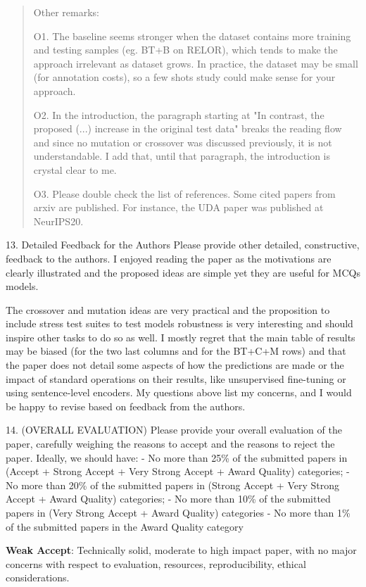 \documentclass{article}
\begin{document}
\begin{quote}
Other remarks:

O1. The baseline seems stronger when the dataset contains more training and testing samples (eg. BT+B on RELOR), which tends to make the approach irrelevant as dataset grows. In practice, the dataset may be small (for annotation costs), so a few shots study could make sense for your approach. 

O2. In the introduction, the paragraph starting at "In contrast, the proposed (...) increase in the original test data" breaks the reading flow and since no mutation or crossover was discussed previously, it is not understandable. I add that, until that paragraph, the introduction is crystal clear to me. 

O3. Please double check the list of references. 
Some cited papers from arxiv are published. For instance, the UDA paper was published at NeurIPS20. 
\end{quote}

13. {Detailed Feedback for the Authors} Please provide other detailed, constructive, feedback to the authors.
I enjoyed reading the paper as the motivations are clearly illustrated and the proposed ideas are simple yet they are useful for MCQs models. 

The crossover and mutation ideas are very practical and the proposition to include stress test suites to test models robustness is very interesting and should inspire other tasks to do so as well. 
I mostly regret that the main table of results may be biased (for the two last columns and for the BT+C+M rows) and that the paper does not detail some aspects of how the predictions are made or the impact of standard operations on their results, like unsupervised fine-tuning or using sentence-level encoders. My questions above list my concerns, and I would be happy to revise based on feedback from the authors. 

14. (OVERALL EVALUATION) Please provide your overall evaluation of the paper, carefully weighing the reasons to accept and the reasons to reject the paper. Ideally, we should have: - No more than 25\% of the submitted papers 
in (Accept + Strong Accept + Very Strong Accept + Award Quality) categories; 
- No more than 20\% of the submitted papers in (Strong Accept + Very Strong Accept + Award Quality) categories;
- No more than 10\% of the submitted papers in (Very Strong Accept + Award Quality) categories 
- No more than 1\% of the submitted papers in the Award Quality category

\textbf{Weak Accept}: Technically solid, moderate to high impact paper, with no major concerns with respect to evaluation, resources, reproducibility, ethical considerations.
\end{document}
